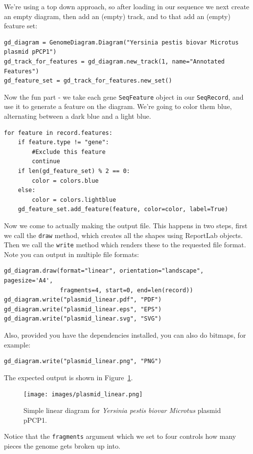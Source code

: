 \documentclass{report}
\begin{document}
We're using a top down approach, so after loading in our sequence we next
create an empty diagram, then add an (empty) track, and to that add an
(empty) feature set:

\begin{verbatim}
gd_diagram = GenomeDiagram.Diagram("Yersinia pestis biovar Microtus plasmid pPCP1")
gd_track_for_features = gd_diagram.new_track(1, name="Annotated Features")
gd_feature_set = gd_track_for_features.new_set()
\end{verbatim}

Now the fun part - we take each gene \verb|SeqFeature| object in our
\verb|SeqRecord|, and use it to generate a feature on the diagram. We're
going to color them blue, alternating between a dark blue and a light blue.
\begin{verbatim}
for feature in record.features:
    if feature.type != "gene":
        #Exclude this feature
        continue
    if len(gd_feature_set) % 2 == 0:
        color = colors.blue
    else:
        color = colors.lightblue
    gd_feature_set.add_feature(feature, color=color, label=True)
\end{verbatim}

Now we come to actually making the output file.  This happens in two steps,
first we call the \verb|draw| method, which creates all the shapes using
ReportLab objects.  Then we call the \verb|write| method which renders these
to the requested file format.  Note you can output in multiple file formats:

\begin{verbatim}
gd_diagram.draw(format="linear", orientation="landscape", pagesize='A4',
                fragments=4, start=0, end=len(record))
gd_diagram.write("plasmid_linear.pdf", "PDF")
gd_diagram.write("plasmid_linear.eps", "EPS")
gd_diagram.write("plasmid_linear.svg", "SVG")
\end{verbatim}

Also, provided you have the dependencies installed, you can also do bitmaps,
for example:

\begin{verbatim}
gd_diagram.write("plasmid_linear.png", "PNG")
\end{verbatim}

\begin{htmlonly}

\end{htmlonly}
\begin{latexonly}
The expected output is shown in Figure~\ref{fig:plasmid_linear}.
\begin{figure}[htbp]
\centering
\texttt{[image: images/plasmid\_linear.png]}
\caption{Simple linear diagram for \textit{Yersinia pestis biovar Microtus} plasmid pPCP1.}
\label{fig:plasmid_linear}
\end{figure}
\end{latexonly}
Notice that the \verb|fragments| argument which we set to four controls how
many pieces the genome gets broken up into.
\end{document}
